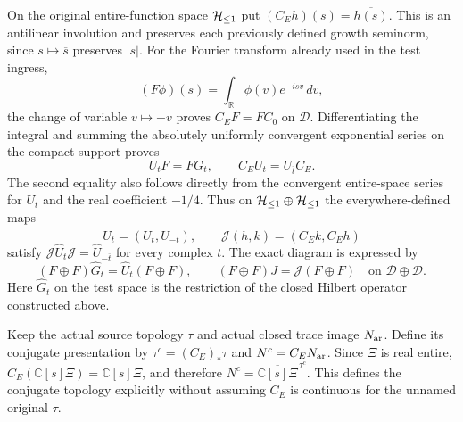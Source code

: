 On the original entire-function space $\mathcal H_{\leq 1}$ put
$(C_Eh)(s)=\overline{h(\overline s)}$. This is an antilinear
involution and preserves each previously defined growth seminorm,
since $s\mapsto\overline s$ preserves $|s|$.
For the Fourier transform already used in the test ingress,
\[
 (F\phi)(s)=\int_{\mathbb R}\phi(v)e^{-isv}\,dv,
\]
the change of variable $v\mapsto-v$ proves
$C_EF=FC_0$ on $\mathscr D$. Differentiating the integral and
summing the absolutely uniformly convergent exponential series
on the compact support proves
\begin{equation}
 U_tF=FG_t,\qquad C_EU_t=U_{\overline t}C_E.
 \label{eq:cq-cartan-Fourier-ingress}
\end{equation}
The second equality also follows directly from the convergent
entire-space series for $U_t$ and the real coefficient $-1/4$.
Thus on $\mathcal H_{\leq 1}\oplus\mathcal H_{\leq 1}$ the everywhere-defined maps
\[
 \widehat U_t=(U_t,U_{-t}),\qquad
 \mathcal J(h,k)=(C_Ek,C_Eh)
\]
satisfy $\mathcal J\widehat U_t\mathcal J
=\widehat U_{-\overline t}$ for every complex $t$. The exact
diagram is expressed by
\[
 (F\oplus F)\widehat G_t=\widehat U_t(F\oplus F),\qquad
 (F\oplus F)J=\mathcal J(F\oplus F)
       \quad\text{on }\mathscr D\oplus\mathscr D.
\]
Here $\widehat G_t$ on the test space is the restriction of
the closed Hilbert operator constructed above.

Keep the actual source topology $\tau$ and actual closed
trace image $N_{\rm ar}$. Define its conjugate presentation by
$\tau^c=(C_E)_*\tau$ and $N^c=C_EN_{\rm ar}$.
Since $\Xi$ is real entire, $C_E(\mathbb C[s]\Xi)
=\mathbb C[s]\Xi$, and therefore
$N^c=\overline{\mathbb C[s]\Xi}^{\,\tau^c}$.
This defines the conjugate topology explicitly without assuming
$C_E$ is continuous for the unnamed original $\tau$.

